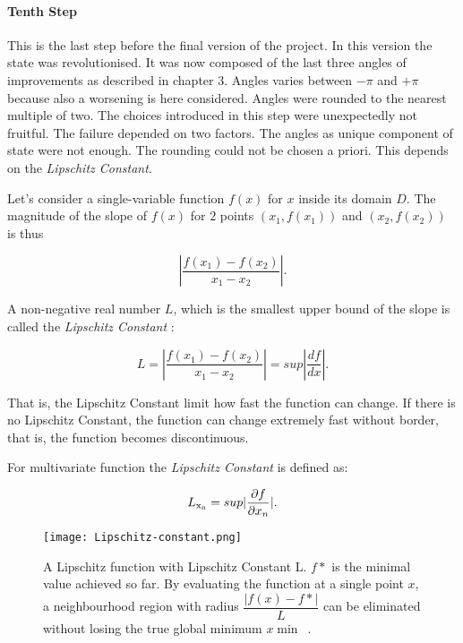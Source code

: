 \paragraph{Tenth Step} This is the last step before the final version of the project. In this version the state was revolutionised. It was now composed of the last three angles of improvements as described in chapter 3. Angles varies between $- \pi$ and $+ \pi$ because also a worsening is here considered. Angles were rounded to the nearest multiple of two. The choices introduced in this step were unexpectedly not fruitful. The failure depended on two factors. The angles as unique component of state were not enough. The rounding could not be chosen a priori. This depends on the \textit{Lipschitz Constant}. 

Let's consider a single-variable function $f(x)$ for $x$ inside its domain $D$. The magnitude of the slope of $f(x)$ for $2$ points $(x_1, f(x_1))$ and $(x_2, f(x_2))$ is thus 

\begin{equation}
	|\dfrac{f(x_1)-f(x_2)}{x_1 - x_2}|.
\end{equation}

A non-negative real number $L$, which is the smallest upper bound of the slope is called the \textit{Lipschitz Constant} :

\begin{equation}
L = |\dfrac{f(x_1)-f(x_2)}{x_1 - x_2}| = sup|\dfrac{df}{dx}|.
\end{equation}

That is, the Lipschitz Constant limit how fast the function can change. If there is no Lipschitz Constant, the function can change extremely fast without border, that is, the function becomes discontinuous.

For multivariate function the \textit{Lipschitz Constant} is defined as:

\begin{equation}
L\textsubscript{x\textsubscript{n}} = sup|\dfrac{\partial f}{\partial x_n}|.
\end{equation}

\begin{figure} [h!]
	\centering
	\texttt{[image: Lipschitz-constant.png]}
	\caption{A Lipschitz function with Lipschitz Constant L. $f*$ is the minimal value achieved so far. By evaluating the function at a single point $x$, a neighbourhood region with radius $\dfrac{|f(x) − f*|}{L}$ can be eliminated without losing the true global minimum $x \min$~\cite{RGLipschitz}.}
	\label{fig:LipschitzConstant}
\end{figure}

